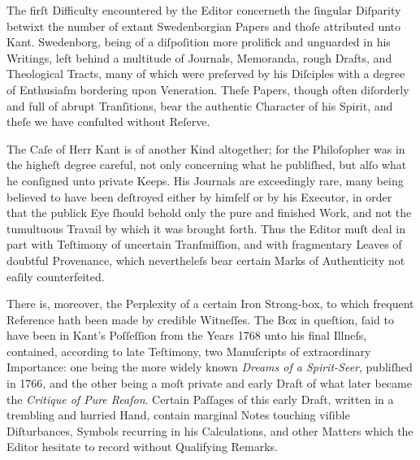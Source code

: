\documentclass[12pt]{book}
\begin{document}
\vspace{1em}

\noindent
The firſt Difficulty encountered by the Editor concerneth the ſingular Diſparity betwixt the number of extant Swedenborgian Papers and thoſe attributed unto Kant. Swedenborg, being of a diſpoſition more prolifick and unguarded in his Writings, left behind a multitude of Journals, Memoranda, rough Drafts, and Theological Tracts, many of which were preſerved by his Diſciples with a degree of Enthusiaſm bordering upon Veneration. Theſe Papers, though often diſorderly and full of abrupt Tranſitions, bear the authentic Character of his Spirit, and theſe we have conſulted without Reſerve.

\vspace{1em}

\noindent
The Caſe of Herr Kant is of another Kind altogether; for the Philoſopher was in the higheſt degree careful, not only concerning what he publiſhed, but alſo what he conſigned unto private Keeps. His Journals are exceedingly rare, many being believed to have been deſtroyed either by himſelf or by his Executor, in order that the publick Eye ſhould behold only the pure and finished Work, and not the tumultuous Travail by which it was brought forth. Thus the Editor muſt deal in part with Teſtimony of uncertain Tranſmiſſion, and with fragmentary Leaves of doubtful Provenance, which nevertheleſs bear certain Marks of Authenticity not eaſily counterfeited.

\vspace{1em}

\noindent
There is, moreover, the Perplexity of a certain Iron Strong-box, to which frequent Reference hath been made by credible Witneſſes. The Box in queſtion, ſaid to have been in Kant’s Poſſeſſion from the Years 1768 unto his final Illneſs, contained, according to late Teſtimony, two Manuſcripts of extraordinary Importance: one being the more widely known \textit{Dreams of a Spirit-Seer}, publiſhed in 1766, and the other being a moſt private and early Draft of what later became the \textit{Critique of Pure Reaſon}. Certain Paſſages of this early Draft, written in a trembling and hurried Hand, contain marginal Notes touching viſible Diſturbances, Symbols recurring in his Calculations, and other Matters which the Editor hesitate to record without Qualifying Remarks.

\vspace{1em}
\end{document}
